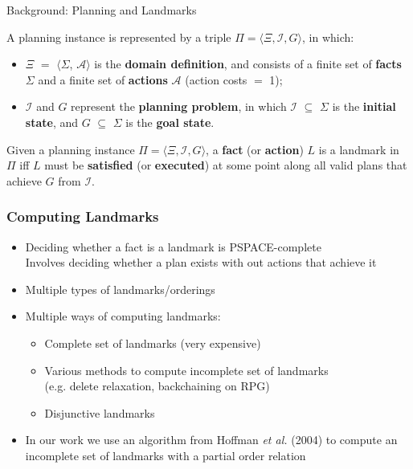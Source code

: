 \documentclass{beamer}
\begin{document}
	
    \begin{frame}{Background: Planning and Landmarks}
		\begin{definition} 
			A planning instance is represented by a triple $\Pi = \langle \Xi, \mathcal{I}, G\rangle$, in which:
			\begin{itemize}
				\item $\Xi$ $=$ $\langle$$\Sigma$, $\mathcal{A}$$\rangle$ is the \textbf{domain definition}, and consists of a finite set of \textbf{facts} $\Sigma$ and a finite set of \textbf{actions} $\mathcal{A}$ (action costs $=$ 1);
				\item $\mathcal{I}$ and $G$ represent the \textbf{planning problem}, in which $\mathcal{I}$ $\subseteq$ $\Sigma$ is the \textbf{initial state}, and $G$ $\subseteq$ $\Sigma$ is the \textbf{goal state}.
			\end{itemize}
		\end{definition}
		\begin{definition}
			Given a planning instance $\Pi = \langle \Xi, \mathcal{I}, G\rangle$, a \textbf{fact} (or \textbf{action}) $L$ is a landmark in $\Pi$ iff $L$ 	must be \textbf{satisfied} (or \textbf{executed}) at some point along all valid plans that achieve $G$ from $\mathcal{I}$.
		\end{definition}
    \end{frame}	
	
	\begin{frame}[c]\frametitle{Computing Landmarks}
		\begin{itemize}
			\item Deciding whether a fact is a landmark is PSPACE-complete\\
				Involves deciding whether a plan exists with out actions that achieve it
			\item Multiple types of landmarks/orderings
			\item Multiple ways of computing landmarks:
			\begin{itemize}
				\item Complete set of landmarks (very expensive)
				\item Various methods to compute incomplete set of landmarks \\(e.g. delete relaxation, backchaining on RPG)
				\item Disjunctive landmarks
			\end{itemize}
			\item In our work we use an algorithm from Hoffman \emph{et al.} (2004) to compute an incomplete set of landmarks with a partial order relation
		\end{itemize}
	\end{frame}
\fi
\end{document}
